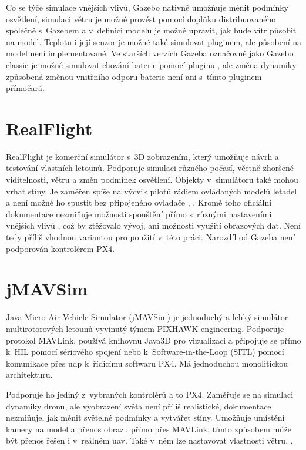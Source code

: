         Co se týče simulace vnějších vlivů, Gazebo nativně umožňuje měnit podmínky osvětlení, simulaci větru je možné provést pomocí doplňku distribuovaného společně s~Gazebem a v~definici modelu je možné upravit, jak bude vítr působit na model. Teplotu i její senzor je možné také simulovat pluginem, ale působení na model není implementované. Ve starších verzích Gazeba označovné jako Gazebo classic je možné simulovat chování baterie pomocí pluginu \cite{batplugin}, ale změna dynamiky způsobená změnou vnitřního odporu baterie není ani s~tímto pluginem přímočará.

    \section{RealFlight} \label{sec:realflight}
        RealFlight je komerční simulátor s~3D zobrazením, který umožňuje návrh a testování vlastních letounů. Podporuje simulaci různého počasí, včetně zhoršené viditelnosti, větru a změn podmínek osvětlení. Objekty v~simulátoru také mohou vrhat stíny. Je zaměřen spíše na výcvik pilotů rádiem ovládaných modelů letadel a není možné ho spustit bez připojeného ovladače \cite{ardupilot:realflight}, \cite{realflight}. Kromě toho oficiální dokumentace nezmiňuje možnosti spouštění přímo s~různými nastaveními vnějších vlivů \cite{realflight}, což by ztěžovalo vývoj, ani možnosti využití obrazových dat. Není tedy příliš vhodnou variantou pro použití v~této práci. Narozdíl od Gazeba není podporován kontrolérem PX4.

    \section{jMAVSim} \label{sec:jmavsim}
        Java Micro Air Vehicle Simulator (jMAVSim) je jednoduchý a lehký simulátor multirotorových letounů vyvinutý týmem PIXHAWK engineering. Podporuje protokol MAVLink, používá knihovnu Java3D pro vizualizaci a připojuje se přímo k~HIL pomocí sériového spojení nebo k~Software-in-the-Loop (SITL) pomocí komunikace přes \acrfull{udp} k~řídicímu softwaru PX4. Má jednoduchou monolitickou architekturu. \cite{Ebeid2018}

        Podporuje ho jediný z~vybraných kontrolérů a to PX4. Zaměřuje se na simulaci dynamiky dronu, ale vyobrazení světa není příliš realistické, dokumentace nezmiňuje, jak měnit světelné podmínky a vytvářet stíny. Umožňuje umístění kamery na model a přenos obrazu přímo přes MAVLink, tímto způsobem může být přenos řešen i v~reálném \acrshort{uav}. Také v~něm lze nastavovat vlastnosti větru. \cite{jmavsim}, \cite{px4:jmavsim}

